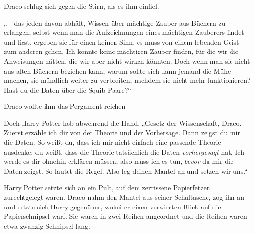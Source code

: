 Draco schlug sich gegen die Stirn, als es ihm einfiel.

„—das jeden davon abhält, Wissen über mächtige Zauber aus Büchern zu erlangen, selbst wenn man die Aufzeichnungen eines mächtigen Zauberers findet und liest, ergeben sie für einen keinen Sinn, es muss von einem lebenden Geist zum anderen gehen. Ich konnte keine mächtigen Zauber finden, für die wir die Anweisungen hätten, die wir aber nicht wirken könnten. Doch wenn man sie nicht aus alten Büchern beziehen kann, warum sollte sich dann jemand die Mühe machen, sie mündlich weiter zu verbreiten, nachdem sie nicht mehr funktionieren? Hast du die Daten über die Squib-Paare?“

Draco wollte ihm das Pergament reichen—

Doch Harry Potter hob abwehrend die Hand. „Gesetz der Wissenschaft, Draco. Zuerst erzähle ich dir von der Theorie und der Vorhersage. Dann zeigst du mir die Daten. So weißt du, dass ich mir nicht einfach eine passende Theorie ausdenke; du weißt, dass die Theorie tatsächlich die Daten \emph{vorhergesagt} hat. Ich werde es dir ohnehin erklären müssen, also muss ich es tun, \emph{bevor} du mir die Daten zeigst. So lautet die Regel. Also leg deinen Mantel an und setzen wir uns.“

Harry Potter setzte sich an ein Pult, auf dem zerrissene Papierfetzen zurechtgelegt waren. Draco nahm den Mantel aus seiner Schultasche, zog ihn an und setzte sich Harry gegenüber, wobei er einen verwirrten Blick auf die Papierschnipsel warf. Sie waren in zwei Reihen angeordnet und die Reihen waren etwa zwanzig Schnipsel lang.

